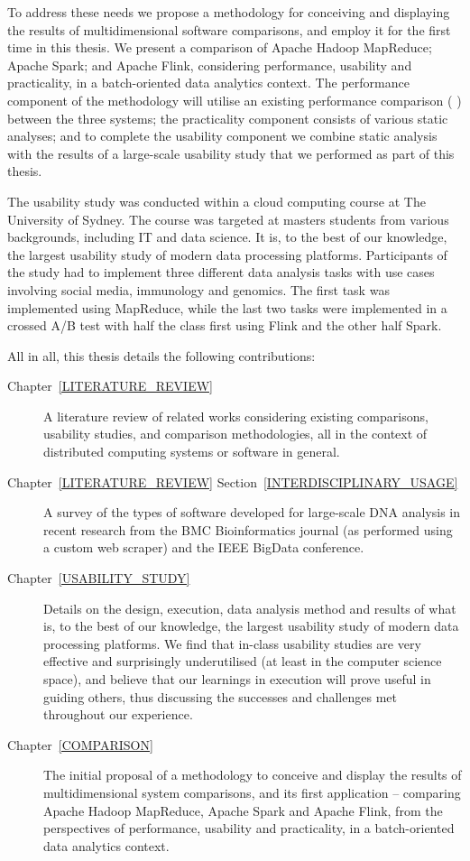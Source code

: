   To address these needs we propose a methodology for conceiving and displaying the results of multidimensional software comparisons, and employ it for the first time in this thesis. We present a comparison of Apache Hadoop MapReduce; Apache Spark; and Apache Flink, considering performance, usability and practicality, in a batch-oriented data analytics context. The performance component of the methodology will utilise an existing performance comparison (\citeauthor{VEIGA:EVALUATION:2015} \cite{VEIGA:EVALUATION:2015}) between the three systems; the practicality component consists of various static analyses; and to complete the usability component we combine static analysis with the results of a large-scale usability study that we performed as part of this thesis.
  
  The usability study was conducted within a cloud computing course at The University of Sydney. The course was targeted at masters students from various backgrounds, including IT and data science. It is, to the best of our knowledge, the largest usability study of modern data processing platforms. Participants of the study had to implement three different data analysis tasks with use cases involving social media, immunology and genomics. The first task was implemented using MapReduce, while the last two tasks were implemented in a crossed A/B test with half the class first using Flink and the other half Spark.
  
  All in all, this thesis details the following contributions:
  
  \begin{description}
    \item [Chapter~\ref{LITERATURE_REVIEW}] A literature review of related works considering existing comparisons, usability studies, and comparison methodologies, all in the context of distributed computing systems or software in general.
    \item [Chapter~\ref{LITERATURE_REVIEW} Section~\ref{INTERDISCIPLINARY_USAGE}] A survey of the types of software developed for large-scale DNA analysis in recent research from the BMC Bioinformatics journal (as performed using a custom web scraper) and the IEEE BigData conference.
  	\item [Chapter~\ref{USABILITY_STUDY}] Details on the design, execution, data analysis method and results of what is, to the best of our knowledge, the largest usability study of modern data processing platforms. We find that in-class usability studies are very effective and surprisingly underutilised (at least in the computer science space), and believe that our learnings in execution will prove useful in guiding others, thus discussing the successes and challenges met throughout our experience.
    \item [Chapter~\ref{COMPARISON}] The initial proposal of a methodology to conceive and display the results of multidimensional system comparisons, and its first application -- comparing Apache Hadoop MapReduce, Apache Spark and Apache Flink, from the perspectives of performance, usability and practicality, in a batch-oriented data analytics context.
  \end{description}

